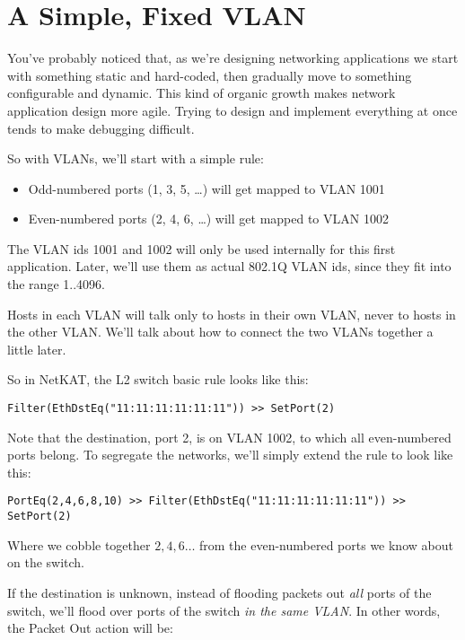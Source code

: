 \section{A Simple, Fixed VLAN}

You've probably noticed that, as we're designing networking applications we start with something 
static and hard-coded, then gradually move to something configurable and dynamic.  This kind of 
organic growth makes network application design more agile.  Trying to design and implement everything
at once tends to make debugging difficult.

So with VLANs, we'll start with a simple rule:

\begin{itemize}
\item Odd-numbered ports (1, 3, 5, \ldots) will get mapped to VLAN 1001
\item Even-numbered ports (2, 4, 6, \ldots) will get mapped to VLAN 1002
\end{itemize}

The VLAN ids 1001 and 1002 will only be used internally for this first application.  Later, we'll use
them as actual 802.1Q VLAN ids, since they fit into the range 1..4096.  

Hosts in each VLAN will talk only to hosts in their own VLAN, never to hosts in the other VLAN.  We'll talk
about how to connect the two VLANs together a little later.  

So in NetKAT, the L2 switch basic rule looks like this:

\begin{verbatim}
Filter(EthDstEq("11:11:11:11:11:11")) >> SetPort(2)
\end{verbatim}

Note that the destination, port 2, is on VLAN 1002, to which all even-numbered ports belong.  
To segregate the networks, we'll simply extend the rule to look like this:

\begin{verbatim}
PortEq(2,4,6,8,10) >> Filter(EthDstEq("11:11:11:11:11:11")) >> SetPort(2)
\end{verbatim}

Where we cobble together $2, 4, 6\ldots$ from the even-numbered ports we know about on the switch.  

If the destination is unknown, instead of flooding packets out \emph{all} ports of the switch, 
we'll flood over ports of the switch \emph{in the same VLAN}.  In other words, the Packet Out action will be:

